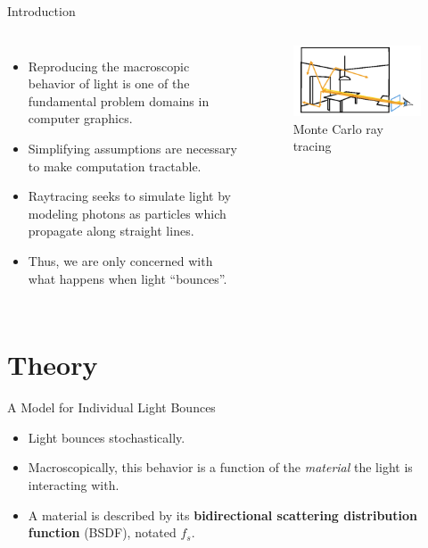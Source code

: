 \documentclass[10pt]{beamer}
\begin{document}
\begin{frame}{Introduction}
  \begin{columns}
    \begin{itemize}
    \item Reproducing the macroscopic behavior of light is one of the fundamental problem domains in computer graphics.
    \item Simplifying assumptions are necessary to make computation tractable.
    \item Raytracing seeks to simulate light by modeling photons as particles which propagate along straight lines.
    \item Thus, we are only concerned with what happens when light ``bounces''.
    \end{itemize}

    \begin{figure}[H]
      \centering
      \includegraphics[width=\linewidth,keepaspectratio]{intro.png}
      \caption{Monte Carlo ray tracing}
    \end{figure}
  \end{columns}
\end{frame}

\section{Theory}
\begin{frame}{A Model for Individual Light Bounces}
  \begin{itemize}
  \item Light bounces stochastically.
  \item Macroscopically, this behavior is a function of the \textit{material} the light is interacting with.
  \item A material is described by its \textbf{bidirectional scattering distribution function} (BSDF), notated \(f_s\).
  \end{itemize}
\end{frame}
\end{document}
